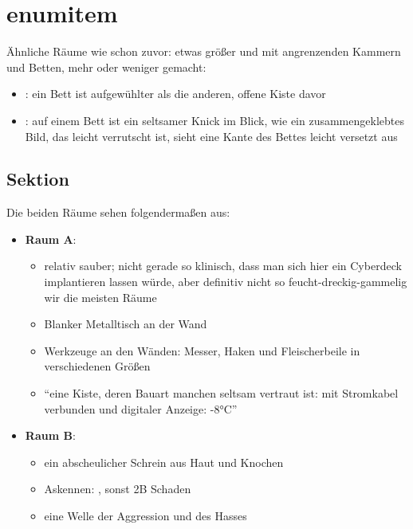\chapter{enumitem}

Ähnliche Räume wie schon zuvor: etwas größer und mit angrenzenden Kammern und Betten, mehr oder weniger gemacht:

\begin{itemize}[label=\textendash]
    \item {}: ein Bett ist aufgewühlter als die anderen, offene Kiste davor
    \item {}: auf einem Bett ist ein seltsamer Knick im Blick, wie ein zusammengeklebtes Bild, das leicht verrutscht ist, sieht eine Kante des Bettes leicht versetzt aus
\end{itemize}

\section{Sektion}

Die beiden Räume sehen folgendermaßen aus:

\begin{itemize}
    \item \textbf{Raum A}:
        \begin{itemize}
            \item  relativ sauber; nicht gerade so klinisch, dass man sich hier ein Cyberdeck implantieren lassen würde, aber definitiv nicht so feucht-dreckig-gammelig wir die meisten Räume
            \item  Blanker Metalltisch an der Wand
            \item  Werkzeuge an den Wänden: Messer, Haken und Fleischerbeile in verschiedenen Größen
            \item  ``eine Kiste, deren Bauart manchen seltsam vertraut ist: mit Stromkabel verbunden und digitaler Anzeige: -8°C''
        \end{itemize}

    \item \textbf{Raum B}:
        \begin{itemize}
            \item  ein abscheulicher Schrein aus Haut und Knochen
            \item  Askennen: , sonst 2B Schaden
            \item  eine Welle der Aggression und des Hasses 
        \end{itemize}
\end{itemize}

